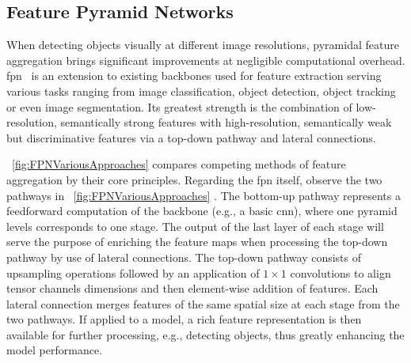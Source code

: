 \subsection{Feature Pyramid Networks}
\label{ssec:FeaturePyramidNetworks}

When detecting objects visually at different image resolutions, pyramidal feature aggregation brings significant improvements at negligible computational overhead. \Gls{fpn}~\cite{lin2017fpn} is an extension to existing backbones used for feature extraction serving various tasks ranging from image classification, object detection, object tracking or even image segmentation. Its greatest strength is the combination of low-resolution, semantically strong features with high-resolution, semantically weak but discriminative features via a top-down pathway and lateral connections.

\figstr{}~\ref{fig:FPNVariousApproaches} compares competing methods of feature aggregation by their core principles. Regarding the \gls{fpn} itself, observe the two pathways in \figstr{}~\ref{fig:FPNVariousApproaches} . The bottom-up pathway represents a feedforward computation of the backbone (e.g., a basic \gls{cnn}), where one pyramid levels corresponds to one stage. The output of the last layer of each stage will serve the purpose of enriching the feature maps when processing the top-down pathway by use of lateral connections. The top-down pathway consists of upsampling operations followed by an application of $1 \times 1$ convolutions to align tensor channels dimensions and then element-wise addition of features. Each lateral connection merges features of the same spatial size at each stage from the two pathways. If applied to a model, a rich feature representation is then available for further processing, e.g., detecting objects, thus greatly enhancing the model performance.

